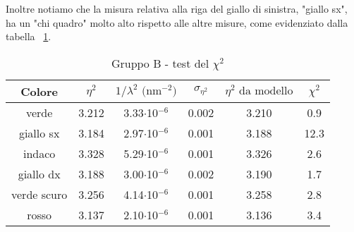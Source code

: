 Inoltre notiamo che la misura relativa alla riga del giallo di sinistra, "giallo sx", ha un "chi quadro" molto alto rispetto alle altre misure, come evidenziato dalla tabella ~\ref{table:tbl13}.
\begin{table}[!htbp]
    {\par\centering
    \begin{tabular}{cccccc}
        \hline
            Colore &
            $\eta^2$ &
            $1/\lambda^2 \text{ (nm$^{-2}$)}$ &
            $\sigma_{\eta^2}$ &
            $\eta^2 \text{ da modello}$ &
            $\chi^2$\\
        \hline
        verde       &   3.212   &   3.33$\cdot$10$^{-6}$  & 0.002   &   3.210   &   0.9\\
        giallo sx   &   3.184   &   2.97$\cdot$10$^{-6}$  & 0.001   &   3.188   &   12.3\\
        indaco      &   3.328   &   5.29$\cdot$10$^{-6}$  & 0.001   &   3.326   &   2.6\\
        giallo dx   &   3.188   &   3.00$\cdot$10$^{-6}$  & 0.002   &   3.190   &   1.7\\
        verde scuro &   3.256   &   4.14$\cdot$10$^{-6}$  & 0.001   &   3.258   &   2.8\\
        rosso       &   3.137   &   2.10$\cdot$10$^{-6}$  & 0.001   &   3.136   &   3.4\\
        \hline
    \end{tabular}
    \par}
    \caption{Gruppo B - test del $\chi^2$} \label{table:tbl13}
\end{table}

